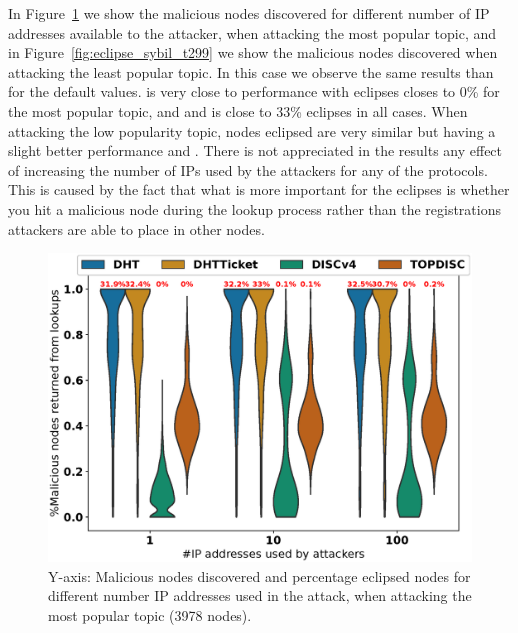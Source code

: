 In Figure~\ref{fig:eclipse_sybil_t0} we show the malicious nodes discovered for different number of IP addresses available to the attacker,  when attacking the most popular topic,  and in Figure~\ref{fig:eclipse_sybil_t299} we show the malicious nodes discovered when attacking the least popular topic.
In this case we observe the same results than for the default values. 
\sysname is very close to \discv performance with eclipses closes to 0\% for the most popular topic, and \altname and \altnameticket is close to 33\% eclipses in all cases.
When attacking the low popularity topic,  nodes eclipsed are very similar but having a slight better performance \discv and \sysname.
There is not appreciated in the results any effect of increasing the number of IPs used by the attackers for any of the protocols.
This is caused by the fact that what is more important for the eclipses is whether you hit a malicious node during the lookup process rather than the registrations attackers are able to place in other nodes.

\begin{figure}[!h]
\includegraphics[width=\linewidth]{results/security/violin_sybilSize_percentageMaliciousDiscovered_t0.eps}
\caption{Y-axis: Malicious nodes discovered and percentage eclipsed nodes for different number IP addresses used in the attack,  when attacking the most popular topic (3978 nodes).}
\label{fig:eclipse_sybil_t0}
\end{figure}



